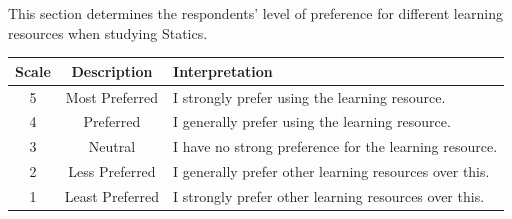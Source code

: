 This section determines the respondents’ level of preference for different learning resources when studying Statics.

\vspace{0.3cm}

\begin{table}[h!]
\centering
\renewcommand{\arraystretch}{1.5}
\begin{tabular}{|c|c|p{6cm}|}
\hline
\textbf{Scale} & \textbf{Description} & \textbf{Interpretation} \\ \hline
5 & Most Preferred & I strongly prefer using the learning resource. \\ \hline
4 & Preferred & I generally prefer using the learning resource. \\ \hline
3 & Neutral & I have no strong preference for the learning resource. \\ \hline
2 & Less Preferred & I generally prefer other learning resources over this. \\ \hline
1 & Least Preferred & I strongly prefer other learning resources over this. \\ \hline
\end{tabular}
\renewcommand{\arraystretch}{1}
\end{table}

\vspace{0.3cm}

